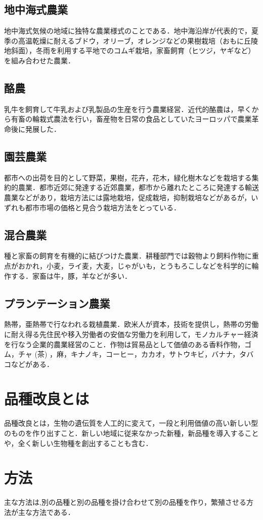 \subsection{地中海式農業}
地中海式気候の地域に独特な農業様式のことである．地中海沿岸が代表的で，夏季の高温乾燥に耐えるブドウ，オリーブ，オレンジなどの果樹栽培（おもに丘陵地斜面），冬雨を利用する平地でのコムギ栽培，家畜飼育（ヒツジ，ヤギなど）を組み合わせた農業．
\subsection{酪農}
乳牛を飼育して牛乳および乳製品の生産を行う農業経営．近代的酪農は，早くから有畜の輪栽式農法を行い，畜産物を日常の食品としていたヨーロッパで農業革命後に発展した．

\subsection{園芸農業}
都市への出荷を目的として野菜，果樹，花卉，花木，緑化樹木などを栽培する集約的農業．都市近郊に発達する近郊農業，都市から離れたところに発達する輸送農業などがあり，栽培方法には露地栽培，促成栽培，抑制栽培などがあるが，いずれも都市市場の価格と見合う栽培方法をとっている．

\subsection{混合農業}
種と家畜の飼育を有機的に結びつけた農業．耕種部門では穀物より飼料作物に重点がおかれ，小麦，ライ麦，大麦，じゃがいも，とうもろこしなどを科学的に輪作する．家畜は牛，豚，羊などが多い．
\subsection{プランテーション農業}
熱帯，亜熱帯で行なわれる栽植農業．欧米人が資本，技術を提供し，熱帯の労働に耐え得る先住民や移入労働者の安価な労働力を利用して，モノカルチャー経済を行なう企業的農業経営のこと．作物は貿易品として価値のある香料作物，ゴム，チャ (茶) ，麻，キナノキ，コーヒー，カカオ，サトウキビ，バナナ，タバコなどがある．
\section{品種改良とは}
品種改良とは，生物の遺伝質を人工的に変えて，一段と利用価値の高い新しい型のものを作り出すこと．新しい地域に従来なかった新種，新品種を導入することや，全く新しい生物種を創出することも含む．\cite{kinoko2015}
\section{方法}
主な方法は,別の品種と別の品種を掛け合わせて別の品種を作り，繁殖させる方法が主な方法である．

